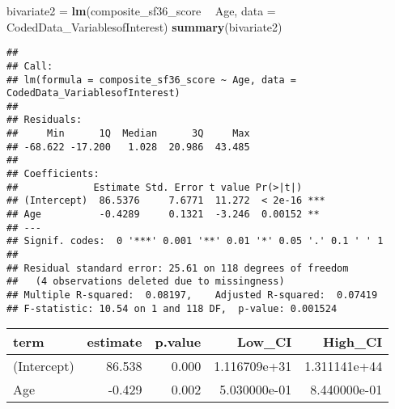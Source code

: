 \documentclass[]{article}
\newenvironment{Shaded}{\begin{snugshade}}{\end{snugshade}}
\newcommand{\DataTypeTok}[1]{\textcolor[rgb]{0.13,0.29,0.53}{#1}}
\newcommand{\DecValTok}[1]{\textcolor[rgb]{0.00,0.00,0.81}{#1}}
\newcommand{\FloatTok}[1]{\textcolor[rgb]{0.00,0.00,0.81}{#1}}
\newcommand{\KeywordTok}[1]{\textcolor[rgb]{0.13,0.29,0.53}{\textbf{#1}}}
\newcommand{\NormalTok}[1]{#1}
\newcommand{\OperatorTok}[1]{\textcolor[rgb]{0.81,0.36,0.00}{\textbf{#1}}}
\newcommand{\StringTok}[1]{\textcolor[rgb]{0.31,0.60,0.02}{#1}}
\begin{document}
\begin{Shaded}
\begin{Highlighting}[]
\NormalTok{bivariate2 =}\StringTok{ }\KeywordTok{lm}\NormalTok{(composite_sf36_score }\OperatorTok{~}\StringTok{ }\NormalTok{Age, }\DataTypeTok{data =}\NormalTok{ CodedData_VariablesofInterest)}
\KeywordTok{summary}\NormalTok{(bivariate2)}
\end{Highlighting}
\end{Shaded}

\begin{verbatim}
## 
## Call:
## lm(formula = composite_sf36_score ~ Age, data = CodedData_VariablesofInterest)
## 
## Residuals:
##     Min      1Q  Median      3Q     Max 
## -68.622 -17.200   1.028  20.986  43.485 
## 
## Coefficients:
##             Estimate Std. Error t value Pr(>|t|)    
## (Intercept)  86.5376     7.6771  11.272  < 2e-16 ***
## Age          -0.4289     0.1321  -3.246  0.00152 ** 
## ---
## Signif. codes:  0 '***' 0.001 '**' 0.01 '*' 0.05 '.' 0.1 ' ' 1
## 
## Residual standard error: 25.61 on 118 degrees of freedom
##   (4 observations deleted due to missingness)
## Multiple R-squared:  0.08197,    Adjusted R-squared:  0.07419 
## F-statistic: 10.54 on 1 and 118 DF,  p-value: 0.001524
\end{verbatim}

\begin{Shaded}
\end{Shaded}

\begin{longtable}[]{@{}lrrrr@{}}
\toprule
term & estimate & p.value & Low\_CI & High\_CI\tabularnewline
\midrule
\endhead
(Intercept) & 86.538 & 0.000 & 1.116709e+31 &
1.311141e+44\tabularnewline
Age & -0.429 & 0.002 & 5.030000e-01 & 8.440000e-01\tabularnewline
\bottomrule
\end{longtable}
\end{document}
